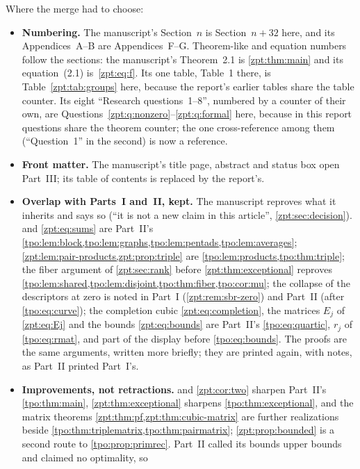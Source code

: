 \documentclass[11pt,letterpaper]{article}
\numberwithin{equation}{section}
\theoremstyle{definition}
\theoremstyle{remark}
\begin{document}
Where the merge had to choose:
\begin{itemize}
\item \textbf{Numbering.} The manuscript's Section~$n$ is Section~$n+32$
here, and its Appendices~A--B are Appendices~F--G. Theorem-like and
equation numbers follow the sections: the manuscript's Theorem~2.1 is
\cref{zpt:thm:main} and its equation~(2.1) is~\eqref{zpt:eq:f}. Its one
table, Table~1 there, is Table~\ref{zpt:tab:groups} here, because the
report's earlier tables share the table counter. Its eight ``Research
questions~1--8'', numbered by a counter of their own, are
Questions~\ref{zpt:q:nonzero}--\ref{zpt:q:formal} here, because in this
report questions share the theorem counter; the one cross-reference among
them (``Question~1'' in the second) is now a reference.
\item \textbf{Front matter.} The manuscript's title page, abstract and
status box open Part~III; its table of contents is replaced by the
report's.
\item \textbf{Overlap with Parts~I and~II, kept.} The manuscript reproves
what it inherits and says so (``it is not a new claim in this article'',
\cref{zpt:sec:decision}). 
and \eqref{zpt:eq:sums} are Part~II's
\cref{tpo:lem:block,tpo:lem:graphs,tpo:lem:pentads,tpo:lem:averages};
\cref{zpt:lem:pair-products,zpt:prop:triple} are
\cref{tpo:lem:products,tpo:thm:triple}; the fiber argument of
\cref{zpt:sec:rank} before \cref{zpt:thm:exceptional} reproves
\cref{tpo:lem:shared,tpo:lem:disjoint,tpo:thm:fiber,tpo:cor:mu}; the
collapse of the descriptors at zero is noted in Part~I
(\cref{zpt:rem:sbr-zero}) and Part~II (after \eqref{tpo:eq:curve}); the
completion cubic \eqref{zpt:eq:completion}, the matrices $E_j$ of
\eqref{zpt:eq:Ej} and the bounds \eqref{zpt:eq:bounds} are Part~II's
\eqref{tpo:eq:quartic}, $r_j$ of \eqref{tpo:eq:rmat}, and part of the display
before \eqref{tpo:eq:bounds}. The proofs are the same arguments, written
more briefly; they are printed again, with notes, as Part~II printed Part~I's.
\item \textbf{Improvements, not retractions.}  and
\cref{zpt:cor:two} sharpen Part~II's \cref{tpo:thm:main},
\cref{zpt:thm:exceptional} sharpens \cref{tpo:thm:exceptional}, and the
matrix theorems \cref{zpt:thm:pf,zpt:thm:cubic-matrix} are further
realizations beside \cref{tpo:thm:triplematrix,tpo:thm:pairmatrix};
\cref{zpt:prop:bounded} is a second route to \cref{tpo:prop:primrec}.
Part~II called its bounds upper bounds and claimed no optimality, so

\end{itemize}
\end{document}
